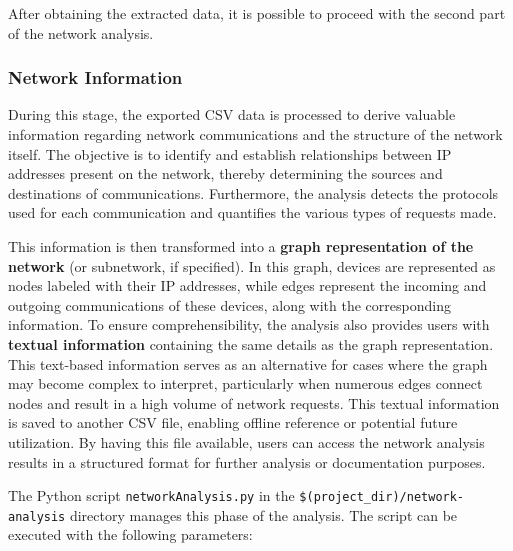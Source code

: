\bigskip
After obtaining the extracted data, it is possible to proceed with the second part of the network analysis.

\subsubsection{Network Information}
\label{subsubsec:4_draw_network}
During this stage, the exported CSV data is processed to derive valuable information regarding network communications and the structure of the network itself. The objective is to identify and establish relationships between IP addresses present on the network, thereby determining the sources and destinations of communications. Furthermore, the analysis detects the protocols used for each communication and quantifies the various types of requests made.

\bigskip
This information is then transformed into a \textbf{graph representation of the network} (or subnetwork, if specified). In this graph, devices are represented as nodes labeled with their IP addresses, while edges represent the incoming and outgoing communications of these devices, along with the corresponding information.\newline
To ensure comprehensibility, the analysis also provides users with \textbf{textual information} containing the same details as the graph representation. This text-based information serves as an alternative for cases where the graph may become complex to interpret, particularly when numerous edges connect nodes and result in a high volume of network requests.\newline
This textual information is saved to another CSV file, enabling offline reference or potential future utilization. By having this file available, users can access the network analysis results in a structured format for further analysis or documentation purposes.

\bigskip
The Python script \texttt{networkAnalysis.py} in the \texttt{\$(project\_dir)/network-analysis} directory manages this phase of the analysis. The script can be executed with the following parameters:

